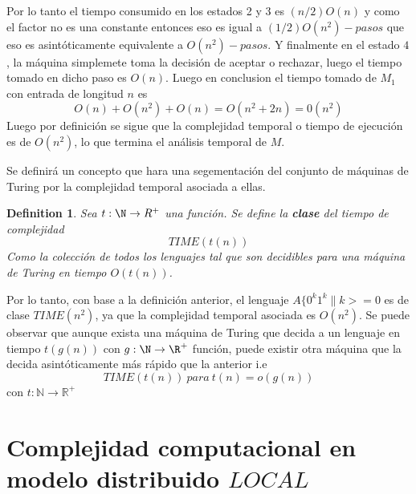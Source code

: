 \documentclass[10pt]{report}
\newtheorem{definition}{Definition}
\begin{document}
    Por lo tanto el tiempo consumido en los estados 2 y 3 es $(n/2)O(n)$ y como el factor no es una constante entonces eso
    es igual a $(1/2)O(n^{2})-pasos$ que eso es asintóticamente equivalente a $O(n^{2})-pasos$.
    Y finalmente en el estado $4$, la máquina simplemete toma la decisión de aceptar o rechazar,
    luego el tiempo tomado en dicho paso es $O(n)$.
    \newline
    Luego en conclusion el tiempo tomado de $M_{1}$ con entrada de longitud $n$ es
    \begin{equation}
        O(n) + O(n^{2}) + O(n) = O(n^{2}+2n) = 0(n^{2})\label{eq:equation10}
    \end{equation}
    Luego por definición se sigue que la complejidad temporal o tiempo de ejecución es de $O(n^{2})$,
    lo que termina el análisis temporal de $M$.\newline

    Se definirá un concepto que hara una segementación del conjunto de máquinas de Turing por la complejidad temporal
    asociada a ellas.
    \begin{definition}
       Sea $t:\N\rightarrow R^{+}$ una función.\newline
        Se define la \textbf{clase} del tiempo de complejidad
        \begin{equation}
            TIME(t(n))\label{eq:equation11}
        \end{equation}
        Como la colección de todos los lenguajes tal que son decidibles para una máquina
        de Turing en tiempo $O(t(n))$.
    \end{definition}
    Por lo tanto, con base a la definición anterior, el lenguaje $A\{0^{k}1^{k}\| k>=0$ es de clase $TIME(n^{2})$,
    ya que la complejidad temporal asociada es $O(n^{2})$.\newline
    Se puede observar que aunque exista una máquina de Turing que decida a un lenguaje en tiempo $t(g(n))$ con
    $g:\N\rightarrow \R^{+}$ función, puede existir otra máquina que la decida asintóticamente más rápido que la anterior
    i.e
    \begin{equation}
        TIME(t(n)) \ para \ t(n)=o(g(n))\label{eq:equation9}
    \end{equation}
    con $t:\mathbb{N}\rightarrow \mathbb{R}^{+}$

    \section{Complejidad computacional en modelo distribuido $LOCAL$}\label{sec:complejidad-computacional-en-modelo-distribuido-$local$}
\end{document}
